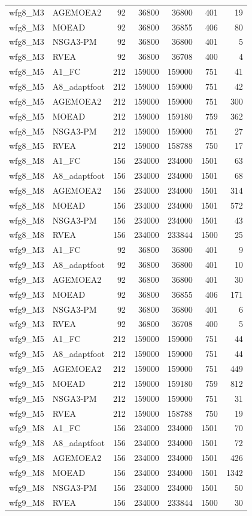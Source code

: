\begin{tabular}{llrrrrr}
wfg8_M3 & AGEMOEA2 & 92 & 36800 & 36800 & 401 & 19 \\
wfg8_M3 & MOEAD & 92 & 36800 & 36855 & 406 & 80 \\
wfg8_M3 & NSGA3-PM & 92 & 36800 & 36800 & 401 & 5 \\
wfg8_M3 & RVEA & 92 & 36800 & 36708 & 400 & 4 \\
wfg8_M5 & A1_FC & 212 & 159000 & 159000 & 751 & 41 \\
wfg8_M5 & A8_adaptfoot & 212 & 159000 & 159000 & 751 & 42 \\
wfg8_M5 & AGEMOEA2 & 212 & 159000 & 159000 & 751 & 300 \\
wfg8_M5 & MOEAD & 212 & 159000 & 159180 & 759 & 362 \\
wfg8_M5 & NSGA3-PM & 212 & 159000 & 159000 & 751 & 27 \\
wfg8_M5 & RVEA & 212 & 159000 & 158788 & 750 & 17 \\
wfg8_M8 & A1_FC & 156 & 234000 & 234000 & 1501 & 63 \\
wfg8_M8 & A8_adaptfoot & 156 & 234000 & 234000 & 1501 & 68 \\
wfg8_M8 & AGEMOEA2 & 156 & 234000 & 234000 & 1501 & 314 \\
wfg8_M8 & MOEAD & 156 & 234000 & 234000 & 1501 & 572 \\
wfg8_M8 & NSGA3-PM & 156 & 234000 & 234000 & 1501 & 43 \\
wfg8_M8 & RVEA & 156 & 234000 & 233844 & 1500 & 25 \\
wfg9_M3 & A1_FC & 92 & 36800 & 36800 & 401 & 9 \\
wfg9_M3 & A8_adaptfoot & 92 & 36800 & 36800 & 401 & 10 \\
wfg9_M3 & AGEMOEA2 & 92 & 36800 & 36800 & 401 & 30 \\
wfg9_M3 & MOEAD & 92 & 36800 & 36855 & 406 & 171 \\
wfg9_M3 & NSGA3-PM & 92 & 36800 & 36800 & 401 & 6 \\
wfg9_M3 & RVEA & 92 & 36800 & 36708 & 400 & 5 \\
wfg9_M5 & A1_FC & 212 & 159000 & 159000 & 751 & 44 \\
wfg9_M5 & A8_adaptfoot & 212 & 159000 & 159000 & 751 & 44 \\
wfg9_M5 & AGEMOEA2 & 212 & 159000 & 159000 & 751 & 449 \\
wfg9_M5 & MOEAD & 212 & 159000 & 159180 & 759 & 812 \\
wfg9_M5 & NSGA3-PM & 212 & 159000 & 159000 & 751 & 31 \\
wfg9_M5 & RVEA & 212 & 159000 & 158788 & 750 & 19 \\
wfg9_M8 & A1_FC & 156 & 234000 & 234000 & 1501 & 70 \\
wfg9_M8 & A8_adaptfoot & 156 & 234000 & 234000 & 1501 & 72 \\
wfg9_M8 & AGEMOEA2 & 156 & 234000 & 234000 & 1501 & 426 \\
wfg9_M8 & MOEAD & 156 & 234000 & 234000 & 1501 & 1342 \\
wfg9_M8 & NSGA3-PM & 156 & 234000 & 234000 & 1501 & 50 \\
wfg9_M8 & RVEA & 156 & 234000 & 233844 & 1500 & 30 \\
\bottomrule
\end{tabular}
